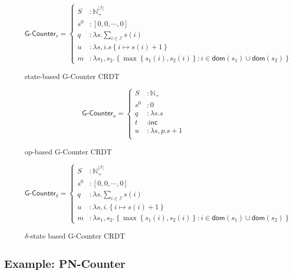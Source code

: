 \begin{figure}[H]
  \centering
  \[
    \textsf{G-Counter}_s = \left\{\begin{aligned}
      S &: \mathbb{N}_+^{|\mathcal{I}|} \\
      s^0 &: \left[ 0, 0, \cdots, 0 \right] \\
      q &: \lambda s. \sum_{i \in \mathcal{I}} s(i) \\
      u &: \lambda s,i. s\left\{ i \mapsto s(i) + 1 \right\} \\
      m &: \lambda s_1, s_2. \left\{ \max\left\{ s_1(i), s_2(i) \right\}: i \in \mathsf{dom}(s_1) \cup
      \mathsf{dom}(s_2) \right\}
    \end{aligned}\right.
  \]
  \caption{state-based \textsf{G-Counter} CRDT}
\end{figure}

\begin{figure}[H]
  \centering
  \[
    \textsf{G-Counter}_o = \left\{\begin{aligned}
      S &: \mathbb{N}_+ \\
      s^0 &: 0 \\
      q &: \lambda s. s \\
      t &: \textsf{inc} \\
      u &: \lambda s,p. s + 1 \\
    \end{aligned}\right.
  \]
  \caption{op-based \textsf{G-Counter} CRDT}
\end{figure}

\begin{figure}[H]
  \centering
  \[
    \textsf{G-Counter}_\delta = \left\{\begin{aligned}
      S &: \mathbb{N}_+^{|\mathcal{I}|} \\
      s^0 &: \left[ 0, 0, \cdots, 0 \right] \\
      q &: \lambda s. \sum_{i \in \mathcal{I}} s(i) \\
      u &: \lambda s,i. \left\{ i \mapsto s(i) + 1 \right\} \\
      m &: \lambda s_1, s_2. \left\{ \max\left\{ s_1(i), s_2(i) \right\}: i \in \mathsf{dom}(s_1) \cup
      \mathsf{dom}(s_2) \right\}
    \end{aligned}\right.
  \]
  \caption{$\delta$-state based \textsf{G-Counter} CRDT}
\end{figure}

\subsection{Example: PN-Counter}
\label{sec:example-pncounter}

